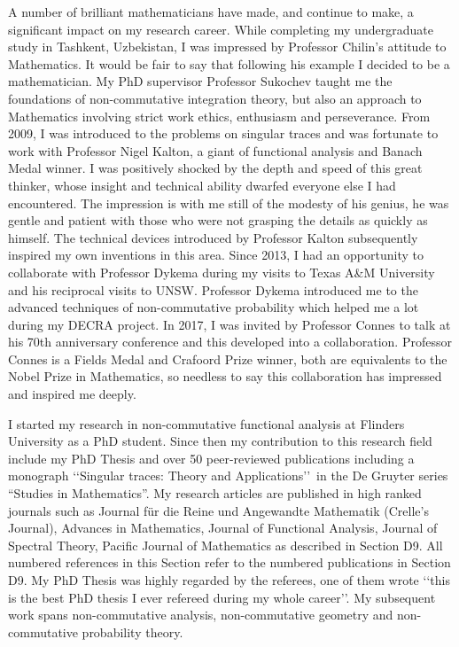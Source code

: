 \documentclass[12pt]{article}
\newcommand{\archeading}[1]{\vspace{.3cm} \noindent{\bfseries #1} \vspace{.1cm}   }
\begin{document}
A number of brilliant mathematicians have made, and continue to make, a significant impact on my research career. While completing my undergraduate study in Tashkent, Uzbekistan, I was impressed by Professor Chilin's attitude to Mathematics. It would be fair to say that following his example I decided to be a mathematician. My PhD supervisor Professor Sukochev taught me the foundations of non-commutative integration theory, but also an approach to Mathematics involving strict work ethics, enthusiasm and perseverance. From 2009, I was introduced to the problems on singular traces and was fortunate to work with Professor Nigel Kalton, a giant of functional analysis and Banach Medal winner. I was positively shocked by the depth and speed of this great thinker, whose insight and technical ability dwarfed everyone else I had encountered. The impression is with me still of the modesty of his genius, he was gentle and patient with those who were not grasping the details as quickly as himself. The technical devices introduced by Professor Kalton subsequently inspired my own inventions in this area. Since 2013, I had an opportunity to collaborate with Professor Dykema during my visits to Texas A\&M University and his reciprocal visits to UNSW. Professor Dykema introduced me to the advanced techniques of non-commutative probability which helped me a lot during my DECRA project. In 2017, I was invited by Professor Connes to talk at his 70th anniversary conference and this developed into a collaboration. Professor Connes is a Fields Medal and Crafoord Prize winner, both are equivalents to the Nobel Prize in Mathematics, so needless to say this collaboration has impressed and inspired me deeply. %

\archeading{Research achievements and contributions}

I started my research in non-commutative functional analysis at Flinders University as a PhD student. Since then my contribution to this research field include my PhD Thesis and over 50 peer-reviewed publications including a monograph \lq\lq Singular traces: Theory and Applications\rq\rq~in the De Gruyter series ``Studies in Mathematics''. My research articles are published in high ranked journals such as Journal f\"ur die Reine und Angewandte Mathematik (Crelle's Journal), Advances in Mathematics, Journal of Functional Analysis, Journal of Spectral Theory, Pacific Journal of Mathematics as described in Section D9. All numbered references in this Section refer to the numbered publications in Section D9. My PhD Thesis was highly regarded by the referees, one of them wrote \lq\lq this is the best PhD thesis I ever refereed during my whole career\rq\rq. My subsequent work spans non-commutative analysis, non-commutative geometry and non-commutative probability theory.
\end{document}
